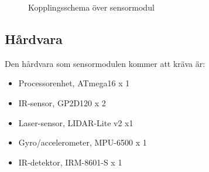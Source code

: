 \documentclass[11pt]{article}
\begin{document}
\begin{flushleft}
\begin{figure}[htbp]
\centering
\noindent{}
	\caption{Kopplingsschema över sensormodul \label{kopplingsschema:sensormodul}}	
\end{figure}
 
\subsection{Hårdvara}
Den hårdvara som sensormodulen kommer att kräva är:

\begin{itemize}
\item{Processorenhet, ATmega16 x 1}
\item{IR-sensor, GP2D120 x 2}
\item{Laser-sensor, LIDAR-Lite v2 x1}
\item{Gyro/accelerometer, MPU-6500 x 1}
\item{IR-detektor, IRM-8601-S x 1}


\end{itemize}
\end{flushleft}
\end{document}
